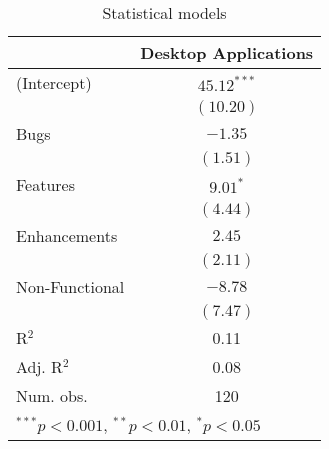 
\begin{table}
\begin{center}
\begin{tabular}{l c }
\hline
               & Desktop Applications \\
\hline
(Intercept)    & $45.12^{***}$ \\
               & $(10.20)$     \\
Bugs           & $-1.35$       \\
               & $(1.51)$      \\
Features       & $9.01^{*}$    \\
               & $(4.44)$      \\
Enhancements   & $2.45$        \\
               & $(2.11)$      \\
Non-Functional & $-8.78$       \\
               & $(7.47)$      \\
\hline
R$^2$          & 0.11          \\
Adj. R$^2$     & 0.08          \\
Num. obs.      & 120           \\
\hline
\multicolumn{2}{l}{\scriptsize{$^{***}p<0.001$, $^{**}p<0.01$, $^*p<0.05$}}
\end{tabular}
\caption{Statistical models}
\label{table:coefficients}
\end{center}
\end{table}
